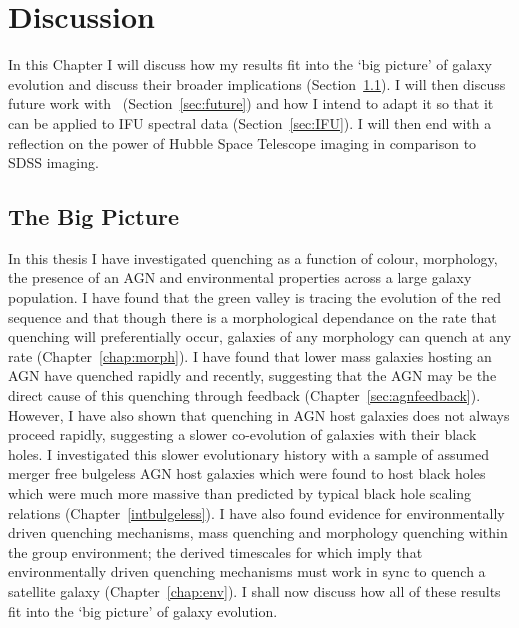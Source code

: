 \chapter{Discussion}

In this Chapter I will discuss how my results fit into the `big picture' of galaxy evolution and discuss their broader implications (Section~\ref{sec:bigpic}). I will then discuss future work with \starpy\ (Section~\ref{sec:future}) and how I intend to adapt it so that it can be applied to IFU spectral data (Section~\ref{sec:IFU}). I will then end with a reflection on the power of Hubble Space Telescope imaging in comparison to SDSS imaging. 


\section{The Big Picture}\label{sec:bigpic}

In this thesis I have investigated quenching as a function of colour, morphology, the presence of an AGN and environmental properties across a large galaxy population. I have found that the green valley is tracing the evolution of the red sequence and that though there is a morphological dependance on the rate that quenching will preferentially occur, galaxies of any morphology can quench at any rate (Chapter~\ref{chap:morph}). I have found that lower mass galaxies hosting an AGN have quenched rapidly and recently, suggesting that the AGN may be the direct cause of this quenching through feedback (Chapter~\ref{sec:agnfeedback}). However, I have also shown that quenching in AGN host galaxies does not always proceed rapidly, suggesting a slower co-evolution of galaxies with their black holes. I investigated this slower evolutionary history with a sample of assumed merger free bulgeless AGN host galaxies which were found to host black holes which were much more massive than predicted by typical black hole scaling relations (Chapter~\ref{intbulgeless}). I have also found evidence for environmentally driven quenching mechanisms, mass quenching and morphology quenching within the group environment; the derived timescales for which imply that environmentally driven quenching mechanisms must work in sync to quench a satellite galaxy (Chapter~\ref{chap:env}). I shall now discuss how all of these results fit into the `big picture' of galaxy evolution. 

